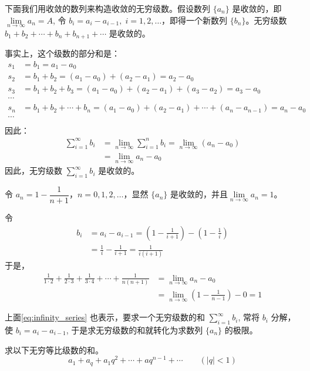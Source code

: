下面我们用收敛的数列来构造收敛的无穷级数。假设数列 $\{a_n\}$ 是收敛的，即$\lim\limits_{n\to\infty}a_n=A$, 令 $b_i=a_i-a_{i-1},\; i=1,2,\ldots$，即得一个新数列 $\{b_n\}$。无穷级数 $b_1+b_2+\cdots+b_n+b_{n+1}+\cdots$ 是收敛的。

事实上，这个级数的部分和是：
\[\begin{split}
    s_1&=b_1=a_1-a_0\\
    s_2&=b_1+b_2=(a_1-a_0)+(a_2-a_1)=a_2-a_0\\
    s_3&=b_1+b_2+b_3=(a_1-a_0)+(a_2-a_1)+(a_3-a_2)=a_3-a_0\\
    \cdots \\
    s_n&=b_1+b_2+\cdots +b_n=(a_1-a_0)+(a_2-a_1)+\cdots +(a_n-a_{n-1})=a_n-a_0\\
    \cdots \\
\end{split} \]
因此：
\begin{equation}
  \label{eq:infinity_series}
    \begin{split}
        \sum^{\infty}_{i=1}b_i&=\lim_{n\to\infty}\sum^n_{i=1}b_i=\lim_{n\to\infty}(a_n-a_0)\\
        &=\lim_{n\to\infty}a_n-a_0
    \end{split}
\end{equation}
因此，无穷级数 $\sum\limits^{\infty}_{i=1}b_i$ 是收敛的。


\begin{example}
令 $a_n=1-\dfrac{1}{n+1}$，$n=0,1,2,\ldots$，显然 $\{a_n\}$ 是收敛的，并且$\lim\limits_{n\to \infty}a_n=1$。

令\[\begin{split}
    b_i&=a_{i}-a_{i-1}=\left(1-\frac{1}{i+1}\right)-\left(1-\frac{1}{i}\right)\\
    &=\frac{1}{i}-\frac{1}{i+1}=\frac{1}{i(i+1)}
\end{split}\]
于是，      
\[\begin{split}
    \frac{1}{1\cdot 2}+\frac{1}{2\cdot 3}+\frac{1}{3\cdot 4}+\cdots +\frac{1}{n(n+1)}&=\lim_{n\to\infty}a_n-a_0\\
    &=\lim_{n\to\infty}\left(1-\frac{1}{n-1}\right)-0=1
\end{split}\]

上面\cref{eq:infinity_series} 也表示，要求一个无穷级数的和 $\sum\limits^{\infty}_{i=1}b_i$, 常将 $b_i$ 分解，使 $b_i=a_i-a_{i-1}$, 于是求无穷级数的和就转化为求数列 $\{a_n\}$ 的极限。
\end{example}

\begin{example}\label{exp:rational_series}
    求以下无穷等比级数的和。
    \[a_1+a_q+a_1q^2+\cdots +aq^{n-1}+\cdots \qquad (|q|<1)\]
\end{example}


